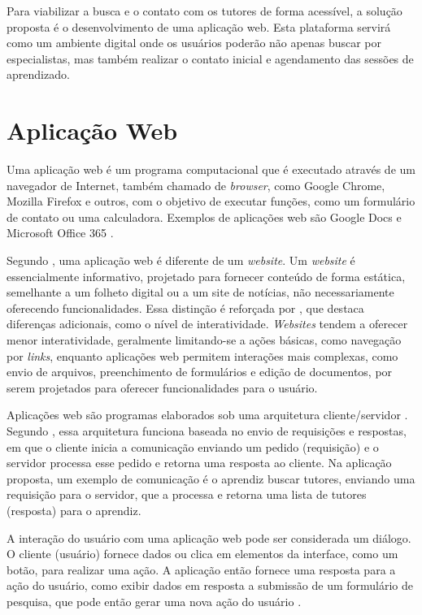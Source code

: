 Para viabilizar a busca e o contato com os tutores de forma acessível, a solução proposta é o desenvolvimento de uma aplicação web. Esta plataforma servirá como um ambiente digital onde os usuários poderão não apenas buscar por especialistas, mas também realizar o contato inicial e agendamento das sessões de aprendizado.

\section[Aplicação Web]{Aplicação Web}
\label{sec:aw}

Uma aplicação web é um programa computacional que é executado através de um navegador de Internet, também chamado de \textit{browser}, como Google Chrome, Mozilla Firefox e outros, com o objetivo de executar funções, como um formulário de contato ou uma calculadora. Exemplos de aplicações web são Google Docs e Microsoft Office 365 \cite{harwood2022internet}.

Segundo , uma aplicação web é diferente de um \textit{website}. Um \textit{website} é essencialmente informativo, projetado para fornecer conteúdo de forma estática, semelhante a um folheto digital ou a um site de notícias, não necessariamente oferecendo funcionalidades. Essa distinção é reforçada por , que destaca diferenças adicionais, como o nível de interatividade. \textit{Websites} tendem a oferecer menor interatividade, geralmente limitando-se a ações básicas, como navegação por \textit{links}, enquanto aplicações web permitem interações mais complexas, como envio de arquivos, preenchimento de formulários e edição de documentos, por serem projetados para oferecer funcionalidades para o usuário. 

Aplicações web são programas elaborados sob uma arquitetura cliente/servidor \cite{shklar2009web}. Segundo , essa arquitetura funciona baseada no envio de requisições e respostas, em que o cliente inicia a comunicação enviando um pedido (requisição) e o servidor processa esse pedido e retorna uma resposta ao cliente. Na aplicação proposta, um exemplo de comunicação é o aprendiz buscar tutores, enviando uma requisição para o servidor, que a processa e retorna uma lista de tutores (resposta) para o aprendiz.

A interação do usuário com uma aplicação web pode ser considerada um diálogo. O cliente (usuário) fornece dados ou clica em elementos da interface, como um botão, para realizar uma ação. A aplicação então fornece uma resposta para a ação do usuário, como exibir dados em resposta a submissão de um formulário de pesquisa, que pode então gerar uma nova ação do usuário \cite{harwood2022internet}.

